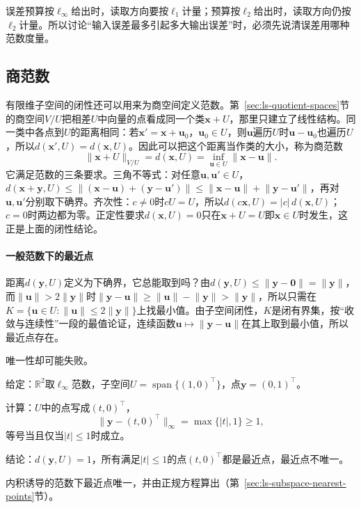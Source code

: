误差预算按$\ell_\infty$给出时，读取方向要按$\ell_1$计量；预算按$\ell_2$给出时，读取方向仍按$\ell_2$计量。所以讨论“输入误差最多引起多大输出误差”时，必须先说清误差用哪种范数度量。

\subsection{商范数}
\label{sec:ls-quotient-norms}

有限维子空间的闭性还可以用来为商空间定义范数。第~\ref{sec:ls-quotient-spaces}节的商空间$V/U$把相差$U$中向量的点看成同一个类$\bm x+U$，那里只建立了线性结构。同一类中各点到$U$的距离相同：若$\bm x'=\bm x+\bm u_0$，$\bm u_0\in U$，则$\bm u$遍历$U$时$\bm u-\bm u_0$也遍历$U$，所以$d(\bm x',U)=d(\bm x,U)$。因此可以把这个距离当作类的大小，称为商范数
\[
 \lVert\bm x+U\rVert_{V/U}=d(\bm x,U)=\inf_{\bm u\in U}\lVert\bm x-\bm u\rVert .
\]
它满足范数的三条要求。三角不等式：对任意$\bm u,\bm u'\in U$，$d(\bm x+\bm y,U)\leq\lVert(\bm x-\bm u)+(\bm y-\bm u')\rVert\leq\lVert\bm x-\bm u\rVert+\lVert\bm y-\bm u'\rVert$，再对$\bm u,\bm u'$分别取下确界。齐次性：$c\neq0$时$cU=U$，所以$d(c\bm x,U)=|c|\,d(\bm x,U)$；$c=0$时两边都为零。正定性要求$d(\bm x,U)=0$只在$\bm x+U=U$即$\bm x\in U$时发生，这正是上面的闭性结论。

\paragraph{一般范数下的最近点}
距离$d(\bm y,U)$定义为下确界，它总能取到吗？由$d(\bm y,U)\leq\lVert\bm y-\bm0\rVert=\lVert\bm y\rVert$，而$\lVert\bm u\rVert>2\lVert\bm y\rVert$时$\lVert\bm y-\bm u\rVert\geq\lVert\bm u\rVert-\lVert\bm y\rVert>\lVert\bm y\rVert$，所以只需在$K=\{\bm u\in U:\lVert\bm u\rVert\leq2\lVert\bm y\rVert\}$上找最小值。由子空间闭性，$K$是闭有界集，按“收敛与连续性”一段的最值论证，连续函数$\bm u\mapsto\lVert\bm y-\bm u\rVert$在其上取到最小值，所以最近点存在。

唯一性却可能失败。
\begin{example}
\label{ex:ls-linf-nonunique-nearest}
给定：$\mathbb R^2$取$\ell_\infty$范数，子空间$U=\operatorname{span}\{(1,0)^\top\}$，点$\bm y=(0,1)^\top$。

计算：$U$中的点写成$(t,0)^\top$，
\[
 \lVert\bm y-(t,0)^\top\rVert_\infty=\max\{|t|,1\}\geq1,
\]
等号当且仅当$|t|\leq1$时成立。

结论：$d(\bm y,U)=1$，所有满足$|t|\leq1$的点$(t,0)^\top$都是最近点，最近点不唯一。
\end{example}
内积诱导的范数下最近点唯一，并由正规方程算出（第~\ref{sec:ls-subspace-nearest-points}节）。
